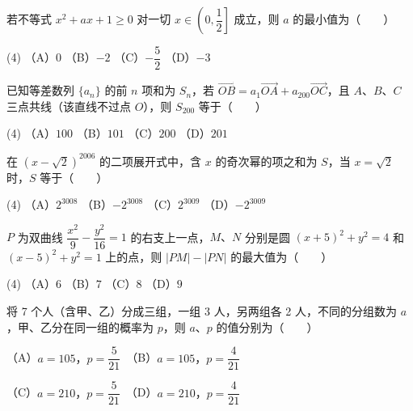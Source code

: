 \begin{question}
若不等式 $x^2+ax+1\geqslant0$ 对一切 $x\in\left(0,\dfrac12\right]$ 成立，则 $a$ 的最小值为\mbox{（　　）}

\begin{gkopts}(4)
\task （A）$0$
\task （B）$-2$
\task （C）$-\dfrac52$
\task （D）$-3$
\end{gkopts}

\end{question}
\begin{question}
已知等差数列 $\{a_n\}$ 的前 $n$ 项和为 $S_n$，若 $\overrightarrow{OB}=a_1\overrightarrow{OA}+a_{200}\overrightarrow{OC}$，且 $A\text{、}B\text{、}C$ 三点共线（该直线不过点 $O$），则 $S_{200}$ 等于\mbox{（　　）}

\begin{gkopts}(4)
\task （A）$100$
\task （B）$101$
\task （C）$200$
\task （D）$201$
\end{gkopts}

\end{question}
\begin{question}
在 $(x-\sqrt2)^{2006}$ 的二项展开式中，含 $x$ 的奇次幂的项之和为 $S$，当 $x=\sqrt2$ 时，$S$ 等于\mbox{（　　）}

\begin{gkopts}(4)
\task （A）$2^{3008}$
\task （B）$-2^{3008}$
\task （C）$2^{3009}$
\task （D）$-2^{3009}$
\end{gkopts}

\end{question}
\begin{question}
$P$ 为双曲线 $\dfrac{x^2}{9}-\dfrac{y^2}{16}=1$ 的右支上一点，$M\text{、}N$ 分别是圆 $(x+5)^2+y^2=4$ 和 $(x-5)^2+y^2=1$ 上的点，则 $|PM|-|PN|$ 的最大值为\mbox{（　　）}

\begin{gkopts}(4)
\task （A）$6$
\task （B）$7$
\task （C）$8$
\task （D）$9$
\end{gkopts}

\end{question}
\begin{question}
将 7 个人（含甲、乙）分成三组，一组 3 人，另两组各 2 人，不同的分组数为 $a$，甲、乙分在同一组的概率为 $p$，则 $a\text{、}p$ 的值分别为\mbox{（　　）}

（A）$a=105\text{，}p=\dfrac5{21}$　（B）$a=105\text{，}p=\dfrac4{21}$

（C）$a=210\text{，}p=\dfrac5{21}$　（D）$a=210\text{，}p=\dfrac4{21}$

\Needspace{0.4\textheight}
\end{question}
